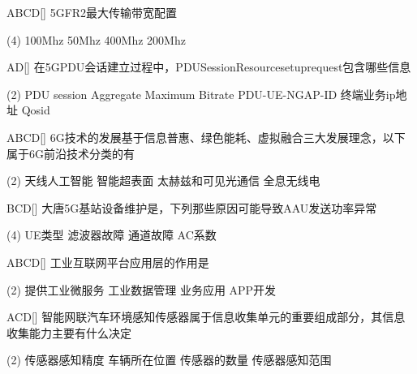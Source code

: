 \begin{choice}{\;ABCD\;}[]
    5GFR2最大传输带宽配置
    \begin{tasks}(4)
        \task 100Mhz
        \task 50Mhz
        \task 400Mhz
        \task 200Mhz
    \end{tasks}
\end{choice}

\begin{choice}{\;AD\;}[]
    在5GPDU会话建立过程中，PDU\;Session\;Resource\;setup\;request包含哪些信息
    \begin{tasks}(2)
        \task PDU session Aggregate Maximum Bitrate
        \task PDU-UE-NGAP-ID
        \task 终端业务ip地址
        \task Qos\;id
    \end{tasks}
\end{choice}


\begin{choice}{\;ABCD\;}[]
    6G技术的发展基于信息普惠、绿色能耗、虚拟融合三大发展理念，以下属于6G前沿技术分类的有
    \begin{tasks}(2)
        \task 天线人工智能
        \task 智能超表面
        \task 太赫兹和可见光通信
        \task 全息无线电
    \end{tasks}
\end{choice}


\begin{choice}{\;BCD\;}[]
    大唐5G基站设备维护是，下列那些原因可能导致AAU发送功率异常
    \begin{tasks}(4)
        \task UE类型
        \task 滤波器故障
        \task 通道故障
        \task AC系数
    \end{tasks}
\end{choice}


\begin{choice}{\;ABCD\;}[]
    工业互联网平台应用层的作用是
    \begin{tasks}(2)
        \task 提供工业微服务
        \task 工业数据管理
        \task 业务应用
        \task APP开发
    \end{tasks}
\end{choice}


\begin{choice}{\;ACD\;}[]
    智能网联汽车环境感知传感器属于信息收集单元的重要组成部分，其信息收集能力主要有什么决定
    \begin{tasks}(2)
        \task 传感器感知精度
        \task 车辆所在位置
        \task 传感器的数量
        \task 传感器感知范围
    \end{tasks}
\end{choice}


